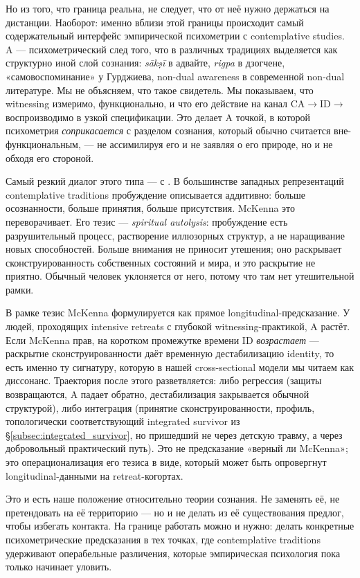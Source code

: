 Но из того, что граница реальна, не следует, что от неё нужно держаться на дистанции. Наоборот: именно вблизи этой границы происходит самый содержательный интерфейс эмпирической психометрии с contemplative studies. A --- психометрический след того, что в различных традициях выделяется как структурно иной слой сознания: \textit{sākṣī} в адвайте, \textit{rigpa} в дзогчене, «самовоспоминание» у Гурджиева, non-dual awareness в современной non-dual литературе. Мы не объясняем, что такое свидетель. Мы показываем, что witnessing измеримо, функционально, и что его действие на канал CA$\to$ID$\to$\EAF{} воспроизводимо в узкой спецификации. Это делает A точкой, в которой психометрия \emph{соприкасается} с разделом сознания, который обычно считается вне-функциональным, --- не ассимилируя его и не заявляя о его природе, но и не обходя его стороной.

Самый резкий диалог этого типа --- с \citet{mckenna2002, mckenna2004, mckenna2013}. В большинстве западных репрезентаций contemplative traditions пробуждение описывается аддитивно: больше осознанности, больше принятия, больше присутствия. McKenna это переворачивает. Его тезис --- \emph{spiritual autolysis}: пробуждение есть разрушительный процесс, растворение иллюзорных структур, а не наращивание новых способностей. Больше внимания не приносит утешения; оно раскрывает сконструированность собственных состояний и мира, и это раскрытие не приятно. Обычный человек уклоняется от него, потому что там нет утешительной рамки.

В рамке \DEIC{} тезис McKenna формулируется как прямое longitudinal-предсказание. У людей, проходящих intensive retreats с глубокой witnessing-практикой, A растёт. Если McKenna прав, на коротком промежутке времени ID \emph{возрастает} --- раскрытие сконструированности даёт временную дестабилизацию identity, то есть именно ту сигнатуру, которую в нашей cross-sectional модели мы читаем как диссонанс. Траектория после этого разветвляется: либо регрессия (защиты возвращаются, A падает обратно, дестабилизация закрывается обычной структурой), либо интеграция (принятие сконструированности, профиль, топологически соответствующий integrated survivor из §\ref{subsec:integrated_survivor}, но пришедший не через детскую травму, а через добровольный практический путь). Это не предсказание «верный ли McKenna»; это операционализация его тезиса в виде, который может быть опровергнут longitudinal-данными на retreat-когортах.

Это и есть наше положение относительно теории сознания. Не заменять её, не претендовать на её территорию --- но и не делать из её существования предлог, чтобы избегать контакта. На границе работать можно и нужно: делать конкретные психометрические предсказания в тех точках, где contemplative traditions удерживают операбельные различения, которые эмпирическая психология пока только начинает уловить.

